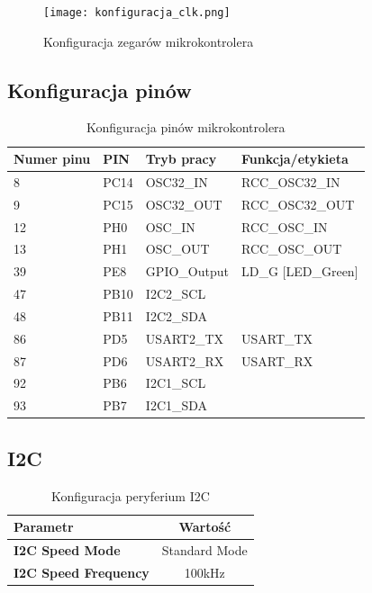 \documentclass[10pt, a4paper]{article}
\begin{document}
\newpage
\begin{figure}[H]
	\centering
	\texttt{[image: konfiguracja\_clk.png]}
	\caption{Konfiguracja zegarów mikrokontrolera}
	\label{fig:KonfiguracjaZegara}
\end{figure}

\subsection{Konfiguracja pinów}

\begin{table}[H]
	\centering
	\begin{tabular}{|l|l|l|l|}
		\hline
		Numer pinu	&	PIN & Tryb pracy & Funkcja/etykieta\\
		\hline
		8&	PC14 & OSC32\_IN &	RCC\_OSC32\_IN	\\
		9&	PC15 & OSC32\_OUT &	RCC\_OSC32\_OUT	\\
		12&	PH0 & OSC\_IN &	RCC\_OSC\_IN	\\
		13&	PH1 & OSC\_OUT &	RCC\_OSC\_OUT	\\
		39&	PE8 &	GPIO\_Output&	LD\_G [LED\_Green] \\
		47&	PB10 &	I2C2\_SCL&	\\
		48&	PB11 &	I2C2\_SDA&	\\
		86&	PD5 &	USART2\_TX&	USART\_TX\\
		87&	PD6 &	USART2\_RX&	USART\_RX\\
		92&	PB6 &	I2C1\_SCL&	\\
		93&	PB7 &	I2C1\_SDA&	\\
		\hline
	\end{tabular}
	\caption{Konfiguracja pinów mikrokontrolera}
	\label{tab:KonfiguracjaPinów}	
\end{table}

\subsection{I2C}
\begin{table}[H]
	\centering
	\begin{tabular}{|l|c|} \hline
		\textbf{Parametr} & Wartość \\
		\hline
		\hline  \textbf{I2C Speed Mode}&Standard Mode  \\\hline
		\textbf{I2C Speed Frequency} & 100kHz\\
		\hline
	\end{tabular}
	\caption{Konfiguracja peryferium I2C}
	\label{tab:I2C}
\end{table}
\end{document}
